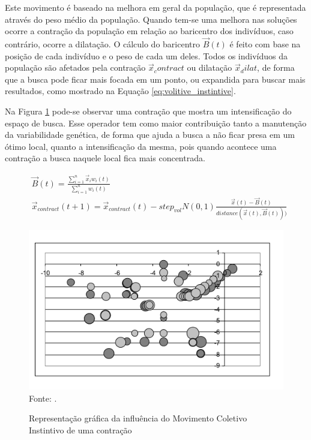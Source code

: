 Este movimento é baseado na melhora em geral da população, que é representada através do peso médio da população. Quando tem-se uma melhora nas soluções ocorre a contração da população em relação ao baricentro dos indivíduos, caso contrário, ocorre a dilatação. O cálculo do baricentro $\vec{B}(t)$ é feito com base na posição de cada indivíduo e o peso de cada um deles. Todos os indivíduos da população são afetados pela contração $\vec{x}_contract$ ou dilatação $\vec{x}_dilat$, de forma que a busca pode ficar mais focada em um ponto, ou expandida para buscar mais resultados, como mostrado na Equação \ref{eq:volitive_instintive}. 

Na Figura \ref{fig:volitute_moviment} pode-se observar uma contração que mostra um intensificação do espaço de busca. Esse operador tem como maior contribuição tanto a manutenção da variabilidade genética, de forma que ajuda a busca a não ficar presa em um ótimo local, quanto a intensificação da mesma, pois quando acontece uma contração a busca naquele local fica mais concentrada.

\begin{equation}
\label{eq:volitive_instintive}
\begin{split}
& \vec{B}(t) = \frac{\sum_{i=1}^{n} \vec{x}_i  w_i(t)}{\sum_{i=1}^{n} w_i(t)} \\
& \vec{x}_{contract}(t+1) = \vec{x}_{contract}(t) - step_{vol}N(0,1) \frac{\vec{x}(t)-\vec{B}(t)} {\textit{distance}(\vec{x}(t),\vec{B}(t)))}
\end{split}
\end{equation}

\begin{figure}[!htb]
	\caption{Representação gráfica da influência do Movimento Coletivo Instintivo de uma contração}
	\centering
	\includegraphics[scale=0.5]{images/movimento_volatil.png}
	\label{fig:volitute_moviment}{\\Fonte: .}
\end{figure}

